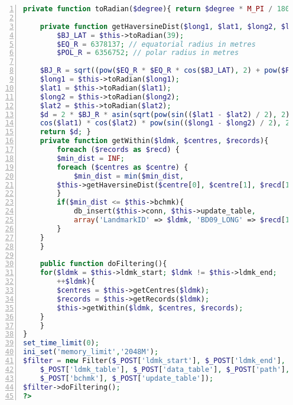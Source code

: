 \begin{lstlisting}[language = PHP, caption = {Outlier Removal}, label = {AList:outlier_rmvl}, frame=single, numbers=left, stepnumber=1]
    private function toRadian($degree){ return $degree * M_PI / 180; }
    
    private function getHaversineDist($long1, $lat1, $long2, $lat2){
        $BJ_LAT = $this->toRadian(39);
        $EQ_R = 6378137; // equatorial radius in metres
        $POL_R = 6356752; // polar radius in metres

	$BJ_R = sqrt((pow($EQ_R * $EQ_R * cos($BJ_LAT), 2) + pow($POL_R * $POL_R * sin($BJ_LAT), 2)) / (pow($EQ_R * cos($BJ_LAT), 2) + pow($EQ_R * sin($BJ_LAT), 2)));
	$long1 = $this->toRadian($long1);
	$lat1 = $this->toRadian($lat1);
	$long2 = $this->toRadian($long2);
	$lat2 = $this->toRadian($lat2);
	$d = 2 * $BJ_R * asin(sqrt(pow(sin(($lat1 - $lat2) / 2), 2) + 
	cos($lat1) * cos($lat2) * pow(sin(($long1 - $long2) / 2), 2)));
	return $d; }
    private function getWithin($ldmk, $centres, $records){
        foreach ($records as $recd) {
	    $min_dist = INF;
	    foreach ($centres as $centre) {
	        $min_dist = min($min_dist, 
		$this->getHaversineDist($centre[0], $centre[1], $recd[1], $recd[2]));
	    }
	    if($min_dist <= $this->bchmk){
	        db_insert($this->conn, $this->update_table, 
			array('LandmarkID' => $ldmk, 'BD09_LONG' => $recd[1], 'BD09_LAT' => $recd[2]));
	    }
	}
    }
    
    public function doFiltering(){
	for($ldmk = $this->ldmk_start; $ldmk != $this->ldmk_end; 
		++$ldmk){
	    $centres = $this->getCentres($ldmk);
	    $records = $this->getRecords($ldmk);
	    $this->getWithin($ldmk, $centres, $records);
	}
    }
}
set_time_limit(0);
ini_set('memory_limit','2048M');
$filter = new Filter($_POST['ldmk_start'], $_POST['ldmk_end'], 
	$_POST['ldmk_table'], $_POST['data_table'], $_POST['path'], 
	$_POST['bchmk'], $_POST['update_table']);
$filter->doFiltering();
?>
\end{lstlisting}

